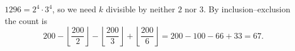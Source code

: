 $1296=2^4\cdot3^4$, so we need $k$ divisible by neither $2$ nor $3$. By inclusion--exclusion the count is
\[200-\left\lfloor\dfrac{200}{2}\right\rfloor-\left\lfloor\dfrac{200}{3}\right\rfloor+\left\lfloor\dfrac{200}{6}\right\rfloor=200-100-66+33=\boxed{67}.\]
